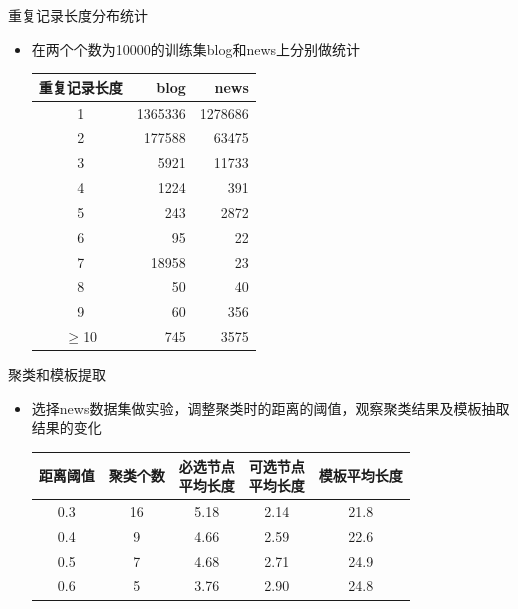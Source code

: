 \begin{frame}{重复记录长度分布统计}
  \begin{itemize}
  \item 在两个个数为10000的训练集blog和news上分别做统计
\begin{table}[h]
  \centering
\begin{tabular}{crr}
  \toprule
重复记录长度 & blog & news \\
\hline
1 & 1365336 & 1278686 \\
2 & 177588 & 63475 \\
3 & 5921 & 11733 \\
4 & 1224 & 391 \\
5 & 243 & 2872 \\
6 & 95 & 22 \\
7 & 18958 & 23 \\
8 & 50 & 40 \\
9 & 60 & 356 \\
$\ge$10 & 745 & 3575 \\
\bottomrule
\end{tabular}
\end{table}
\end{itemize}
\end{frame}

\begin{frame}[label=sec-3-4]{聚类和模板提取}
\begin{itemize}
\item 选择news数据集做实验，调整聚类时的距离的阈值，观察聚类结果及模板抽取结果的变化
\begin{table}[h]
\begin{tabular}{ccccc}
  \toprule
距离阈值 & 聚类个数 & \pbox{2.5in}{必选节点\\ 平均长度} & \pbox{2.5in}{可选节点\\
  平均长度} & 模板平均长度 \\
\hline
0.3 & 16 & 5.18 & 2.14 & 21.8 \\
0.4 & 9 & 4.66 & 2.59 & 22.6 \\
0.5 & 7 & 4.68 & 2.71 & 24.9 \\
0.6 & 5 & 3.76 & 2.90 & 24.8 \\
\bottomrule
\end{tabular}
\end{table}
\end{itemize}
\end{frame}


